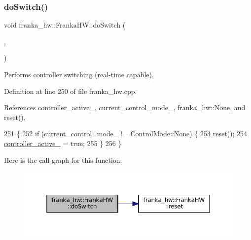 \subsubsection{\texorpdfstring{do\+Switch()}{doSwitch()}}
{\footnotesize\ttfamily void franka\+\_\+hw\+::\+Franka\+H\+W\+::do\+Switch (\begin{DoxyParamCaption}\item[{const std\+::list$<$ hardware\+\_\+interface\+::\+Controller\+Info $>$ \&}]{,  }\item[{const std\+::list$<$ hardware\+\_\+interface\+::\+Controller\+Info $>$ \&}]{ }\end{DoxyParamCaption})\hspace{0.3cm}{\ttfamily [override]}}

Performs controller switching (real-\/time capable). 

Definition at line 250 of file franka\+\_\+hw.\+cpp.



References controller\+\_\+active\+\_\+, current\+\_\+control\+\_\+mode\+\_\+, franka\+\_\+hw\+::\+None, and reset().


\begin{DoxyCode}
251                                                                             \{
252   \textcolor{keywordflow}{if} (\hyperlink{classfranka__hw_1_1FrankaHW_a4eb4ed0043449742cadefa5809d9c6f0}{current\_control\_mode\_} != \hyperlink{namespacefranka__hw_afa416558ce4baace5ac6c71bd5d2c98ca6adf97f83acf6453d4a6a4b1070f3754}{ControlMode::None}) \{
253     \hyperlink{classfranka__hw_1_1FrankaHW_aaa0bc020099cb6dba41728252d0c7df4}{reset}();
254     \hyperlink{classfranka__hw_1_1FrankaHW_aa207ee4ba133fdb1b3887c9639b47b40}{controller\_active\_} = \textcolor{keyword}{true};
255   \}
256 \}
\end{DoxyCode}
Here is the call graph for this function\+:
\nopagebreak
\begin{figure}[H]
\begin{center}
\leavevmode
\includegraphics[width=350pt]{classfranka__hw_1_1FrankaHW_ab29812769471d212a30dac6c19c12884_cgraph}
\end{center}
\end{figure}
\mbox{\label{classfranka__hw_1_1FrankaHW_afb0f49fec764be80e4c89e29706a4936}} 
